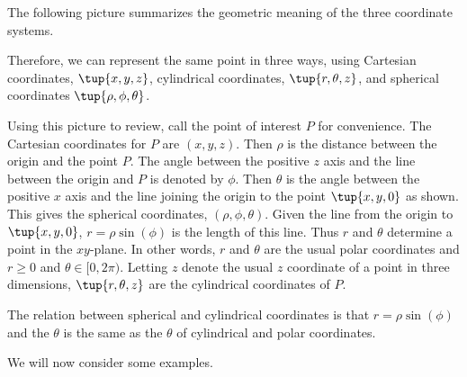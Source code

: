 The following picture summarizes the geometric meaning of the three coordinate systems. 

\begin{center}
\end{center}

Therefore, we can represent the same point in three ways, using Cartesian coordinates, $\tup{x,y,z}$, cylindrical coordinates, $\tup{r, \theta, z }$, and spherical coordinates $\tup{\rho, \phi, \theta }$. 

Using this picture to review, call the point of interest $P$ for convenience. The Cartesian coordinates for $P$ are $(x,y,z)$. Then $\rho $ is the distance between the origin and the point $P$. The angle between
the positive $z$ axis and the line between the origin and $P$
 is denoted by $\phi $. Then $\theta $ is the angle
between the positive $x$ axis and the line joining the origin to the point 
$\tup{x,y,0} $ as shown. This gives the spherical coordinates, $( \rho, \phi, \theta)$. Given the line from the origin to $\tup{x,y,0} $,  $r=\rho \sin(\phi)$ is the length of this
line. Thus $r$ and $\theta $ determine a point in the $xy$-plane. In other words, $r$ and $\theta $ are the usual polar coordinates and $r\geq 0$ and $\theta \in \lbrack 0,2\pi )$. Letting $z$ denote the usual 
$z$ coordinate of a point in three dimensions, 
$\tup{r,\theta ,z} $ are the cylindrical coordinates of $P$. 

The relation between spherical and cylindrical coordinates is that $r=\rho
\sin(\phi)$ and the $\theta$ is the same as the $\theta$ of cylindrical and polar
coordinates. 

We will now consider some examples.


